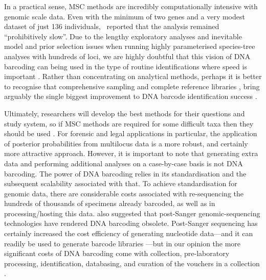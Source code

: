 \documentclass[12pt]{article}
\begin{document}
In a practical sense, MSC methods are incredibly computationally intensive with genomic scale data. Even with the minimum of two genes and a very modest dataset of just 136 individuals, \citeauthor{Dowton2014}\ reported that the analysis remained ``prohibitively slow''. Due to the lengthy exploratory analyses and inevitable model and prior selection issues when running highly parameterised species-tree analyses with hundreds of loci, we are highly doubtful that this vision of DNA barcoding can being used in the type of routine identifications where speed is important \citep{Armstrong2005}. Rather than concentrating on analytical methods, perhaps it is better to recognise that comprehensive sampling and complete reference libraries \citep{Virgilio2012,Boykin2012}, bring arguably the single biggest improvement to DNA barcode identification success \citep{Ekrem2007}.

Ultimately, researchers will develop the best methods for their questions and study system, so if MSC methods are required for some difficult taxa then they should be used \citep{Dupuis2012}. For forensic and legal applications in particular, the application of posterior probabilities from multilocus data is a more robust, and certainly more attractive approach. However, it is important to note that generating extra data and performing additional analyses on a case-by-case basis is not DNA barcoding. The power of DNA barcoding relies in its standardisation and the subsequent scalability associated with that. To achieve standardisation for genomic data, there are considerable costs associated with re-sequencing the hundreds of thousands of specimens already barcoded, as well as in processing/hosting this data. \citep{Taylor2012} also suggested that post-Sanger genomic-sequencing technologies have rendered DNA barcoding obsolete. Post-Sanger sequencing has certainly increased the cost efficiency of generating nucleotide data---and it can readily be used to generate barcode libraries \citep{Shokralla2014}---but in our opinion the more significant costs of DNA barcoding come with collection, pre-laboratory processing, identification, databasing, and curation of the vouchers in a collection \citep{Borisenko2009,Gregory2005,Puillandre2012}. 
\end{document}
